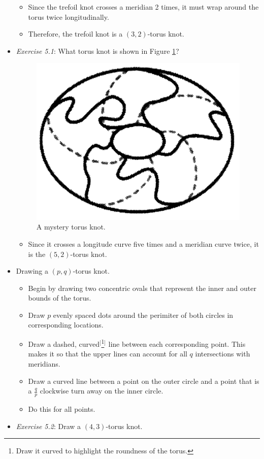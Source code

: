 \documentclass[titlepage]{article}
\numberwithin{figure}{section}
\numberwithin{table}{section}
\numberwithin{equation}{section}
\begin{document}
\begin{itemize}
\begin{itemize}
        \item Since the trefoil knot crosses a meridian 2 times, it must wrap around the torus twice longitudinally.
        \item Therefore, the trefoil knot is a $(3,2)$-torus knot.
    \end{itemize}
    \item \emph{Exercise 5.1}: What torus knot is shown in Figure \ref{fig:ex5-1}?
    \begin{figure}[h!]
        \centering
        \includegraphics[width=0.2\linewidth]{Blender/ex5-1.png}
        \caption{A mystery torus knot.}
        \label{fig:ex5-1}
    \end{figure}
    \begin{itemize}
        \item Since it crosses a longitude curve five times and a meridian curve twice, it is the $(5,2)$-torus knot.
    \end{itemize}
    \item Drawing a $(p,q)$-torus knot.
    \begin{itemize}
        \item Begin by drawing two concentric ovals that represent the inner and outer bounds of the torus.
        \item Draw $p$ evenly spaced dots around the perimiter of both circles in corresponding locations.
        \item Draw a dashed, curved$^[$\footnote{Draw it curved to highlight the roundness of the torus.}$^]$ line between each corresponding point. This makes it so that the upper lines can account for all $q$ intersections with meridians.
        \item Draw a curved line between a point on the outer circle and a point that is a $\frac{q}{p}$ clockwise turn away on the inner circle.
        \item Do this for all points.
    \end{itemize}
    \item \emph{Exercise 5.2}: Draw a $(4,3)$-torus knot.
    \begin{figure}[h!]
        \centering
\end{figure}
\end{itemize}
\end{document}
